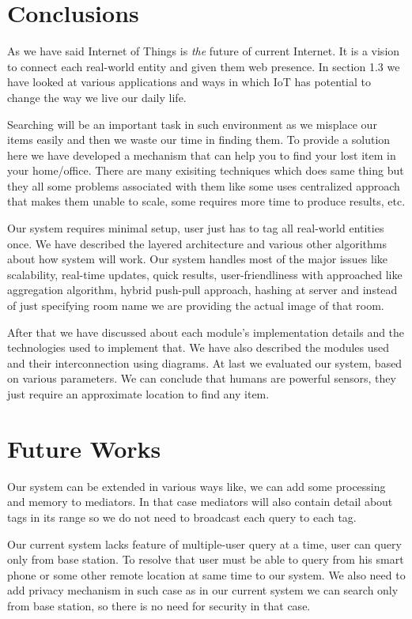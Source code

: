 \documentclass [a4paper,12pt]{book}
\begin{document}
\section{Conclusions}
As we have said Internet of Things is \emph{the} future of current Internet. It is a vision to connect each real-world entity and given them web presence. In section 1.3 we have looked at various applications and ways in which IoT has potential to change the way we live our daily life.

Searching will be an important task in such environment as we misplace our items easily and then we waste our time in finding them. To provide a solution here we have developed a mechanism that can help you to find your lost item in your home/office. There are many exisiting techniques which does same thing but they all some problems associated with them like some uses centralized approach that makes them unable to scale, some requires more time to produce results, etc.

Our system requires minimal setup, user just has to tag all real-world entities once. We have described the layered architecture and various other algorithms about how system will work. Our system handles most of the major issues like scalability, real-time updates, quick results, user-friendliness with approached like aggregation algorithm, hybrid push-pull approach, hashing at server and instead of just specifying room name we are providing the actual image of that room.

After that we have discussed about each module's implementation details and the technologies used to implement that. We have also described the modules used and their interconnection using diagrams. At last we evaluated our system, based on various parameters. We can conclude that humans are powerful sensors, they just require an approximate location to find any item.

\section{Future Works}
Our system can be extended in various ways like, we can add some processing and memory to mediators. In that case mediators will also contain detail about tags in its range so we do not need to broadcast each query to each tag.

Our current system lacks feature of multiple-user query at a time, user can query only from base station. To resolve that user must be able to query from his smart phone or some other remote location at same time to our system. We also need to add privacy mechanism in such case as in our current system we can search only from base station, so there is no need for security in that case.
\end{document}
